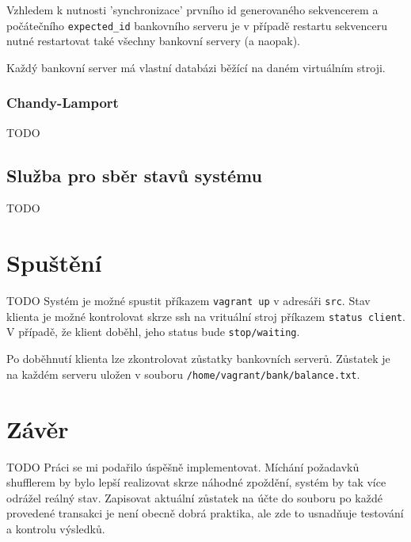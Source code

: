 \documentclass[11pt,a4paper]{scrartcl}
\begin{document}
	Vzhledem k nutnosti 'synchronizace' prvního id generovaného sekvencerem a počátečního \verb|expected_id| bankovního serveru je v případě restartu sekvenceru nutné restartovat také všechny bankovní servery (a naopak).
	
	Každý bankovní server má vlastní databázi běžící na daném virtuálním stroji.
	
	\subsubsection{Chandy-Lamport}
	TODO
	
	\subsection{Služba pro sběr stavů systému}
	TODO
	
	\section{Spuštění}
	TODO
	Systém je možné spustit příkazem \verb|vagrant up| v adresáři \verb|src|. Stav klienta je možné kontrolovat skrze ssh na vrituální stroj příkazem \verb|status client|. V případě, že klient doběhl, jeho status bude \verb|stop/waiting|.
	
	Po doběhnutí klienta lze zkontrolovat zůstatky bankovních serverů. Zůstatek je na každém serveru uložen v souboru \verb|/home/vagrant/bank/balance.txt|.
	
	\section{Závěr}
	TODO
	Práci se mi podařilo úspěšně implementovat. Míchání požadavků shufflerem by bylo lepší realizovat skrze náhodné zpoždění, systém by tak více odrážel reálný stav. Zapisovat aktuální zůstatek na účte do souboru po každé provedené transakci je není obecně dobrá praktika, ale zde to usnadňuje testování a kontrolu výsledků.
	
\end{document}

